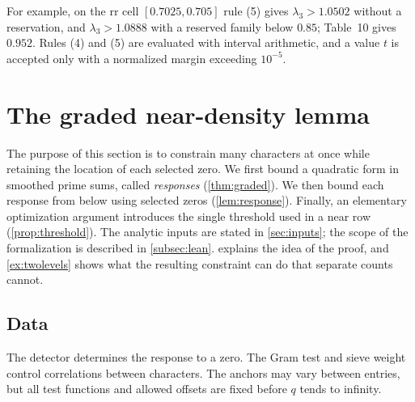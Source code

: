 \documentclass[11pt]{amsart}
\numberwithin{equation}{section}
\theoremstyle{plain}
\theoremstyle{definition}
\theoremstyle{remark}
\newcommand{\1}{\mathbf{1}}
\begin{document}
For example, on the $\mathrm{rr}$ cell $[0.7025,0.705]$ rule (5) gives $\lambda_3>1.0502$ without a
reservation, and $\lambda_3>1.0888$ with a reserved family below $0.85$; Table~10 gives $0.952$.
Rules (4) and (5) are evaluated with interval arithmetic, and a value $t$ is accepted only with a
normalized margin exceeding $10^{-5}$.

\section{The graded near-density lemma}\label{sec:near}

The purpose of this section is to constrain many characters at once while retaining
the location of each selected zero. We first bound a quadratic form in smoothed prime
sums, called \emph{responses} (\cref{thm:graded}). We then bound each response from below
using selected zeros (\cref{lem:response}). Finally, an elementary optimization argument
introduces the single threshold used in a near row (\cref{prop:threshold}).
The analytic inputs are stated in \cref{sec:inputs}; the scope of the formalization is described
in \cref{subsec:lean}.  explains the idea of the proof, and
\cref{ex:twolevels} shows what the resulting constraint can do that separate counts cannot.

\subsection{Data}\label{subsec:neardata}
The detector determines the response to a zero. The Gram test and sieve weight control
correlations between characters. The anchors may vary between entries, but all test
functions and allowed offsets are fixed before $q$ tends to infinity.
\end{document}
